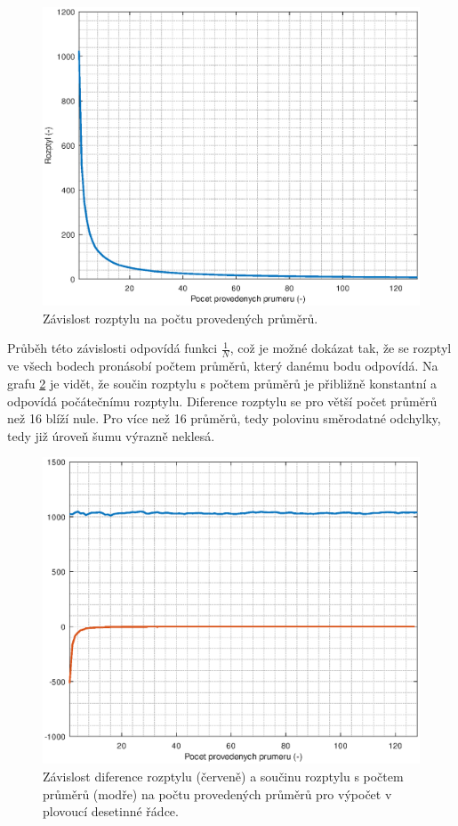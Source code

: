 \begin{figure}[htbp]
\includegraphics[width=\textwidth,keepaspectratio]{images/averaging_float_variance.eps}\caption{Závislost rozptylu na počtu provedených průměrů.}\label{averaging_variance}
\end{figure}	

Průběh této závislosti odpovídá funkci $\frac{1}{N}$, což je možné dokázat tak, že se rozptyl ve všech bodech pronásobí počtem průměrů, který danému bodu odpovídá. Na grafu \ref{averaging_float_difference_error} je vidět, že součin rozptylu s počtem průměrů je přibližně konstantní a odpovídá počátečnímu rozptylu. Diference rozptylu se pro větší počet průměrů než 16 blíží nule. Pro více než 16 průměrů, tedy polovinu směrodatné odchylky, tedy již úroveň šumu výrazně neklesá.

\begin{figure}[htbp]
\includegraphics[width=\textwidth,keepaspectratio]{images/averaging_float_difference_error.eps}\caption{Závislost diference rozptylu (červeně) a součinu rozptylu s počtem průměrů (modře) na počtu provedených průměrů pro výpočet v plovoucí desetinné řádce.}\label{averaging_float_difference_error}
\end{figure}

